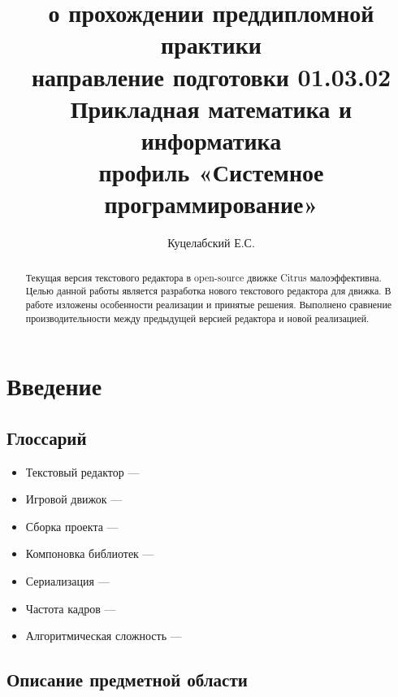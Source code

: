\documentclass{fefu}
\begin{document}
	\title{о прохождении преддипломной практики\\направление подготовки 01.03.02 
	Прикладная математика и информатика\\профиль «Системное программирование»}
	\author{Куцелабский Е.С.}
	
	\makereporttitle
	\tableofcontents
	\newpage
	
	\begin{abstract}
		\par Текущая версия текстового редактора в open-source движке Citrus малоэффективна.
		Целью данной работы является разработка нового текстового редактора для 
		движка. В работе изложены особенности реализации и принятые решения.
		Выполнено сравнение производительности между предыдущей версией редактора и
		новой реализацией.
	\end{abstract}

	\section{Введение}
		\subsection{Глоссарий}
			\begin{itemize}
				\item Текстовый редактор ---
				\item Игровой движок --- 
				\item Сборка проекта ---
				\item Компоновка библиотек ---
				\item Сериализация ---
				\item Частота кадров ---
				\item Алгоритмическая сложность ---
			\end{itemize}
		\subsection{Описание предметной области}
\end{document}
